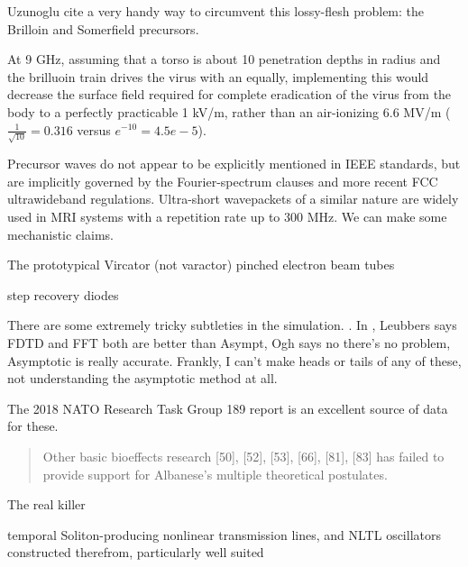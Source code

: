 \documentclass[paper.tex]{subfiles}
\begin{document}
Uzunoglu \cite{Theoretical2020} cite a very handy way to circumvent this lossy-flesh problem: the Brilloin and Somerfield precursors.



At 9 GHz, assuming that a torso is about 10 penetration depths in radius and the brilluoin train drives the virus with an equally, implementing this would decrease the surface field required for complete eradication of the virus from the body to a perfectly practicable 1 kV/m, rather than an air-ionizing 6.6 MV/m ($\frac{1}{\sqrt{10}}=0.316$ versus $e^{-10}=4.5e-5$). 



Precursor waves do not appear to be explicitly mentioned in IEEE standards, but are implicitly governed by the Fourier-spectrum clauses and more recent FCC ultrawideband regulations. Ultra-short wavepackets of a similar nature are widely used in MRI systems with a repetition rate up to 300 MHz. We can make some mechanistic claims.



The prototypical Vircator (not varactor) pinched electron beam tubes 

step recovery diodes

\begin{sidenote}
There are some extremely tricky subtleties in the simulation.  \cite{propagation1992}. In \cite{Comments1993}, Leubbers says FDTD and FFT both are better than Asympt, Ogh says no there's no problem, Asymptotic is really accurate. Frankly, I can't make heads or tails of any of these, not understanding the asymptotic method at all.
\end{sidenote}


The 2018 NATO Research Task Group 189 report \cite{treatyelectromagnetic} is an excellent source of data for these. 

\begin{quote}
	Other basic bioeffects research [50], [52], [53], [66], [81], [83] has failed to provide support for Albanese’s multiple	theoretical postulates.
\end{quote}

The real killer 





temporal Soliton-producing nonlinear transmission lines, and NLTL oscillators constructed therefrom, particularly well suited 
\end{document}
